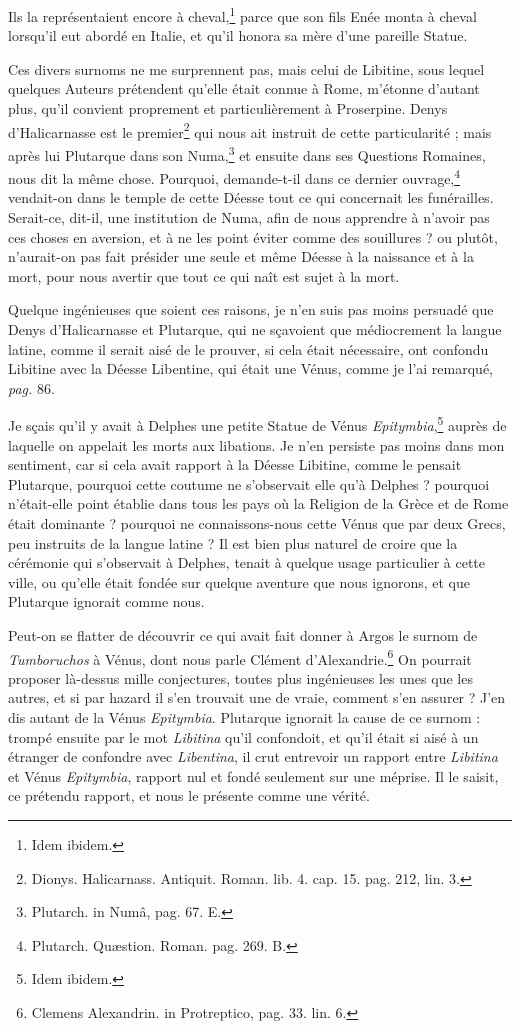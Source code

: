 \documentclass[a4paper, 11pt, oneside, polutonikogreek, french]{article}
\begin{document}
Ils la représentaient encore à cheval,\footnote{Idem ibidem.} parce que son fils Enée monta à cheval lorsqu'il eut abordé en Italie, et qu'il honora sa mère d'une pareille Statue.

Ces divers surnoms ne me surprennent pas, mais celui de Libitine, sous lequel quelques Auteurs prétendent qu'elle était connue à Rome, m'étonne d'autant plus, qu'il convient proprement et particulièrement à Proserpine. Denys d'Halicarnasse est le premier\footnote{Dionys. Halicarnass. Antiquit. Roman. lib. 4. cap. 15. pag. 212, lin. 3.} qui nous ait instruit de cette particularité ; mais après lui Plutarque dans son Numa,\footnote{Plutarch. in Numâ, pag. 67. E.} et ensuite dans ses Questions Romaines, nous dit la même chose. Pourquoi, demande-t-il dans ce dernier ouvrage,\footnote{Plutarch. Quæstion. Roman. pag. 269. B.} vendait-on dans le temple de cette Déesse tout ce qui concernait les funérailles. Serait-ce, dit-il, une institution de Numa, afin de nous apprendre à n'avoir pas ces choses en aversion, et à ne les point éviter comme des souillures ? ou plutôt, n'aurait-on pas fait présider une seule et même Déesse à la naissance et à la mort, pour nous avertir que tout ce qui naît est sujet à la mort.

Quelque ingénieuses que soient ces raisons, je n'en suis pas moins persuadé que Denys d'Halicarnasse et Plutarque, qui ne sçavoient que médiocrement la langue latine, comme il serait aisé de le prouver, si cela était nécessaire, ont confondu Libitine avec la Déesse Libentine, qui était une Vénus, comme je l'ai remarqué, \emph{pag.} 86.

Je sçais qu'il y avait à Delphes une petite Statue de Vénus \emph{Epitymbia},\footnote{Idem ibidem.} auprès de laquelle on appelait les morts aux libations. Je n'en persiste pas moins dans mon sentiment, car si cela avait rapport à la Déesse Libitine, comme le pensait Plutarque, pourquoi cette coutume ne s'observait elle qu'à Delphes ? pourquoi n'était-elle point établie dans tous les pays où la Religion de la Grèce et de Rome était dominante ? pourquoi ne connaissons-nous cette Vénus que par deux Grecs, peu instruits de la langue latine ? Il est bien plus naturel de croire que la cérémonie qui s'observait à Delphes, tenait à quelque usage particulier à cette ville, ou qu'elle était fondée sur quelque aventure que nous ignorons, et que Plutarque ignorait comme nous.

Peut-on se flatter de découvrir ce qui avait fait donner à Argos le surnom de \emph{Tumboruchos} à Vénus, dont nous parle Clément d'Alexandrie.\footnote{Clemens Alexandrin. in Protreptico, pag. 33. lin. 6.} On pourrait proposer là-dessus mille conjectures, toutes plus ingénieuses les unes que les autres, et si par hazard il s'en trouvait une de vraie, comment s'en assurer ? J'en dis autant de la Vénus \emph{Epitymbia}. Plutarque ignorait la cause de ce surnom : trompé ensuite par le mot \emph{Libitina} qu'il confondoit, et qu'il était si aisé à un étranger de confondre avec \emph{Libentina}, il crut entrevoir un rapport entre \emph{Libitina} et Vénus \emph{Epitymbia}, rapport nul et fondé seulement sur une méprise. Il le saisit, ce prétendu rapport, et nous le présente comme une vérité.
\end{document}
